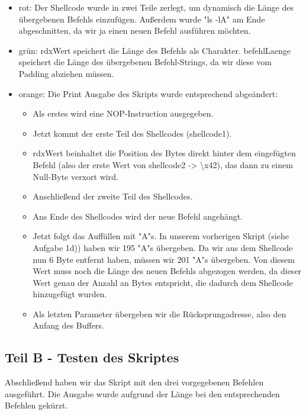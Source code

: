 \documentclass[12pt]{article}
\begin{document}
\begin{itemize}
    \item rot: Der Shellcode wurde in zwei Teile zerlegt, um dynamisch die Länge des übergebenen Befehls einzufügen. Außerdem wurde "ls -lA" am Ende abgeschnitten, da wir ja einen neuen Befehl ausführen möchten. 
    \item grün: rdxWert speichert die Länge des Befehls als Charakter. befehlLaenge speichert die Länge des übergebenen Befehl-Strings, da wir diese vom Padding abziehen müssen.
    \item orange: Die Print Ausgabe des Skripts wurde entsprechend abgeändert:
    \begin{itemize}
        \item Als erstes wird eine NOP-Instruction ausgegeben.
        \item Jetzt kommt der erste Teil des Shellcodes (shellcode1).
        \item rdxWert beinhaltet die Position des Bytes direkt hinter dem eingefügten Befehl (also der erste Wert von shellcode2 -> \textbackslash x42), das dann zu einem Null-Byte verxort wird.
        \item Anschließend der zweite Teil des Shellcodes.
        \item Ans Ende des Shellcodes wird der neue Befehl angehängt.
        \item Jetzt folgt das Auffüllen mit "A"s. In unserem vorherigen Skript (siehe Aufgabe 1d)) haben wir 195 "A"s übergeben. Da wir aus dem Shellcode nun 6 Byte entfernt haben, müssen wir 201 "A"s übergeben. Von diesem Wert muss noch die Länge des neuen Befehls abgezogen werden, da dieser Wert genau der Anzahl an Bytes entspricht, die dadurch dem Shellcode hinzugefügt wurden.
        \item Als letzten Parameter übergeben wir die Rücksprungadresse, also den Anfang des Buffers.\newline
    \end{itemize}
\end{itemize}



\newpage

\subsection{Teil B - Testen des Skriptes}

Abschließend haben wir das Skript mit den drei vorgegebenen Befehlen ausgeführt. Die Ausgabe wurde aufgrund der Länge bei den entsprechenden Befehlen gekürzt.
\end{document}
